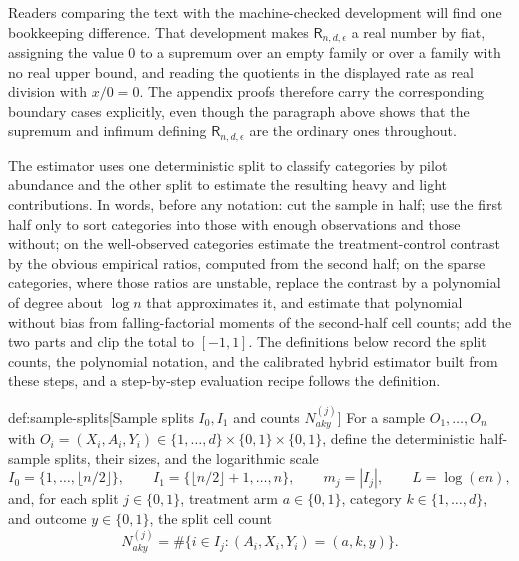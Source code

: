 \documentclass[11pt]{article}
\begin{document}
Readers comparing the text with the machine-checked development will find one bookkeeping difference. That development makes \(\mathsf R_{n,d,\epsilon}\) a real number by fiat, assigning the value \(0\) to a supremum over an empty family or over a family with no real upper bound, and reading the quotients in the displayed rate as real division with \(x/0=0\). The appendix proofs therefore carry the corresponding boundary cases explicitly, even though the paragraph above shows that the supremum and infimum defining \(\mathsf R_{n,d,\epsilon}\) are the ordinary ones throughout.

The estimator uses one deterministic split to classify categories by pilot abundance and the other split to estimate the resulting heavy and light contributions. In words, before any notation: cut the sample in half; use the first half only to sort categories into those with enough observations and those without; on the well-observed categories estimate the treatment-control contrast by the obvious empirical ratios, computed from the second half; on the sparse categories, where those ratios are unstable, replace the contrast by a polynomial of degree about \(\log n\) that approximates it, and estimate that polynomial without bias from falling-factorial moments of the second-half cell counts; add the two parts and clip the total to \([-1,1]\). The definitions below record the split counts, the polynomial notation, and the calibrated hybrid estimator built from these steps, and a step-by-step evaluation recipe follows the definition.

\begin{definitionv}{def:sample-splits}[Sample splits \(I_0,I_1\) and counts \(N^{(j)}_{aky}\)]
For a sample \(O_1,\ldots,O_n\) with \(O_i=(X_i,A_i,Y_i)\in\{1,\ldots,d\}\times\{0,1\}\times\{0,1\}\), define the deterministic half-sample splits, their sizes, and the logarithmic scale
\[
I_0=\{1,\ldots,\lfloor n/2\rfloor\},\qquad I_1=\{\lfloor n/2\rfloor+1,\ldots,n\},\qquad m_j=|I_j|,\qquad L=\log(en),
\]
and, for each split \(j\in\{0,1\}\), treatment arm \(a\in\{0,1\}\), category \(k\in\{1,\ldots,d\}\), and outcome \(y\in\{0,1\}\), the split cell count
\[
N^{(j)}_{aky}=\#\{i\in I_j:(A_i,X_i,Y_i)=(a,k,y)\}.
\]
\end{definitionv}
\end{document}
